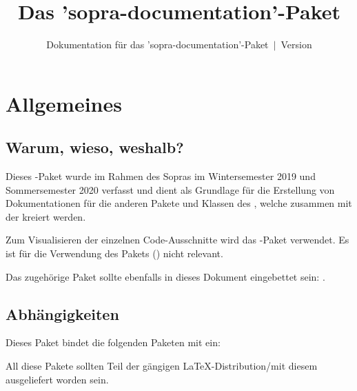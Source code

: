 \documentclass{sopra-base}
\title{Das 'sopra-documentation'-Paket}
\subtitle[Dokumentation für das 'sopra-documentation'-Paket]{Dokumentation für das 'sopra-documentation'-Paket~$\mid$~Version \thesodversion}
\begin{document}
    \maketitle%
%
%

%
%
%
%

\section{Allgemeines}
\subsection{Warum, wieso, weshalb?}
    Dieses \LaTeXe-Paket wurde im Rahmen des Sopras im 
    Wintersemester 2019 und Sommersemester 2020 verfasst und dient als
    Grundlage für die Erstellung von Dokumentationen für die anderen Pakete und Klassen
    des , welche zusammen mit der  kreiert
    werden.\par
    Zum Visualisieren der einzelnen Code-Ausschnitte wird das
    -Paket verwendet. Es ist für die Verwendung des Pakets ()
    nicht relevant.\par
    Das zugehörige Paket sollte ebenfalls in dieses Dokument eingebettet sein: .
\subsection{Abhängigkeiten}
    Dieses Paket bindet die folgenden Paketen mit ein:
    \begin{multicols}{3}
    \end{multicols}
    All diese Pakete sollten Teil der gängigen \LaTeX-Distribution/mit diesem ausgeliefert worden sein.
\end{document}
